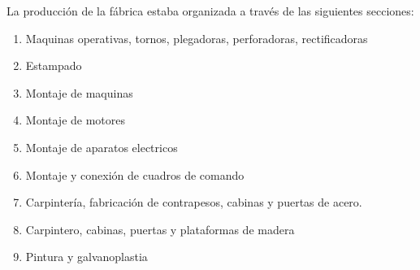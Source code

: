 \documentclass[a4paper,10pt,titlepage]{article}
\begin{document}
		\indent La producci\'on de la f\'abrica estaba organizada a trav\'es de las siguientes secciones:
		\begin{enumerate}
		 \item Maquinas operativas, tornos, plegadoras, perforadoras, rectificadoras
		 \item Estampado
		 \item Montaje de maquinas
		 \item Montaje de motores
		 \item Montaje de aparatos electricos
		 \item Montaje y conexi\'on de cuadros de comando
		 \item Carpinter\'ia, fabricaci\'on de contrapesos, cabinas y puertas de acero.
		 \item Carpintero, cabinas, puertas y plataformas de madera
		 \item Pintura y galvanoplastia
		\end{enumerate}
\end{document}
